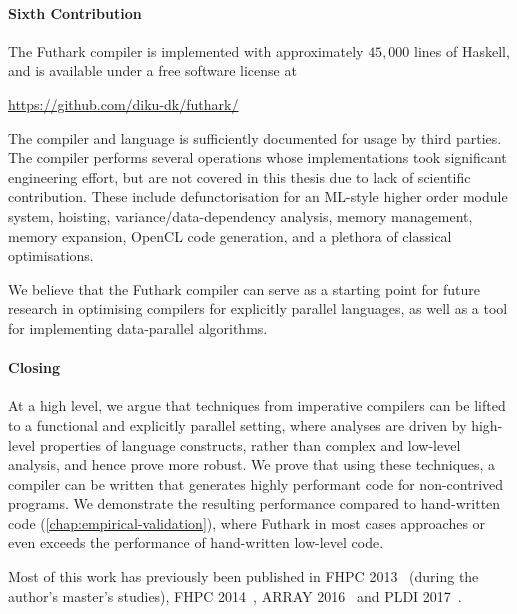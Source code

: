 \paragraph{Sixth Contribution}

The Futhark compiler is implemented with approximately $45,000$ lines
of Haskell, and is available under a free software license at

\centerline{\url{https://github.com/diku-dk/futhark/}}

The compiler and language is sufficiently documented for usage by
third parties.  The compiler performs several operations whose
implementations took significant engineering effort, but are not
covered in this thesis due to lack of scientific contribution.  These
include defunctorisation for an ML-style higher order module system,
hoisting, variance/data-dependency analysis, memory management, memory
expansion, OpenCL code generation, and a plethora of classical
optimisations.

We believe that the Futhark compiler can serve as a starting point for
future research in optimising compilers for explicitly parallel
languages, as well as a tool for implementing data-parallel
algorithms.

\paragraph{Closing}

At a high level, we argue that techniques from imperative compilers
can be lifted to a functional and explicitly parallel setting, where
analyses are driven by high-level properties of language constructs,
rather than complex and low-level analysis, and hence prove more
robust.  We prove that using these techniques, a compiler can be
written that generates highly performant code for non-contrived
programs.  We demonstrate the resulting performance compared to
hand-written code (\cref{chap:empirical-validation}), where Futhark in
most cases approaches or even exceeds the performance of hand-written
low-level code.

Most of this work has previously been published in FHPC
2013~\cite{henriksen2013t2} (during the author's master's studies),
FHPC 2014~\cite{henriksen2014size}, ARRAY 2016~\cite{Futhark:redomap,}
and PLDI 2017~\cite{henriksen2017futhark}.

